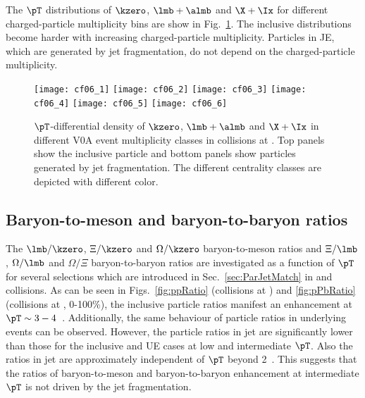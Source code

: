\documentclass[ALICE,manyauthors]{cernphprep}
\begin{document}
The $\pT$ distributions of $\kzero$, $\lmb + \almb$ and $\X + \Ix$ for different charged-particle multiplicity bins are show in Fig.~\ref{fig:pPbSpectwCent}.
The inclusive distributions become harder with increasing charged-particle multiplicity.
Particles in JE, which are generated by jet fragmentation, do not depend on the charged-particle multiplicity.
\begin{figure}[!ht]
	\begin{center}
		\texttt{[image: cf06\_1]}
		\texttt{[image: cf06\_2]}
		\texttt{[image: cf06\_3]}
		\texttt{[image: cf06\_4]}
		\texttt{[image: cf06\_5]}
		\texttt{[image: cf06\_6]}
	\end{center}
	\caption{$\pT$-differential density of $\kzero$, $\lmb + \almb$ and $\X + \Ix$ in different V0A event multiplicity classes in \pPb collisions at \fivenn. Top panels show the inclusive particle and bottom panels show particles generated by jet fragmentation. The different centrality classes are depicted with different color.}
	\label{fig:pPbSpectwCent}
\end{figure}

\subsection{Baryon-to-meson and baryon-to-baryon ratios}
\label{subsec:ParRatios}
The $\lmb/\kzero$, $\Xi/\kzero$ and $\Omega/\kzero$ baryon-to-meson ratios and $\Xi/\lmb$, $\Omega/\lmb$ and $\Omega/\Xi$ baryon-to-baryon ratios are investigated as a function of $\pT$ for several selections which are introduced in Sec.~\ref{sec:ParJetMatch} in \pp and \pPb collisions.
As can be seen in Figs.~\ref{fig:ppRatio} (\pp collisions at \thirteen) and \ref{fig:pPbRatio} (\pPb collisions at \fivenn, 0-100\%), the inclusive particle ratios manifest an enhancement at $\pT \sim 3 - 4 $~\GeVc.
Additionally, the same behaviour of particle ratios in underlying events can be observed.
However, the particle ratios in jet are significantly lower than those for the inclusive and UE cases at low and intermediate $\pT$.
Also the ratios in jet are approximately independent of $\pT$ beyond 2~\GeVc.
This suggests that the ratios of baryon-to-meson and baryon-to-baryon enhancement at intermediate $\pT$ is not driven by the jet fragmentation.
\end{document}
